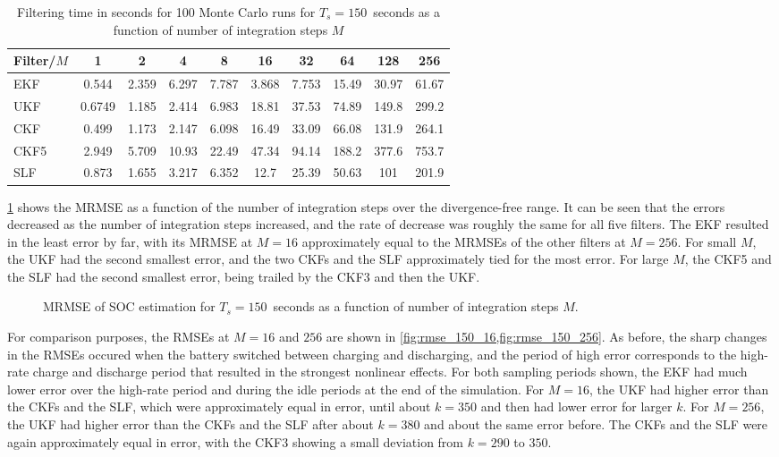\documentclass[../zhang_thesis.tex]{subfiles}
\begin{document}
\begin{table}[h]
\centering
\caption{Filtering time in seconds for 100 Monte Carlo runs for $T_s=150$~seconds as a function of number of integration steps $M$}
\begin{tabular}{@{}lccccccccc@{}}
\toprule
Filter/$M$ & 1      & 2     & 4     & 8     & 16    & 32    & 64    & 128   & 256   \\ \midrule
EKF        & 0.544  & 2.359 & 6.297 & 7.787 & 3.868 & 7.753 & 15.49 & 30.97 & 61.67 \\
UKF        & 0.6749 & 1.185 & 2.414 & 6.983 & 18.81 & 37.53 & 74.89 & 149.8 & 299.2 \\
CKF        & 0.499  & 1.173 & 2.147 & 6.098 & 16.49 & 33.09 & 66.08 & 131.9 & 264.1 \\
CKF5       & 2.949  & 5.709 & 10.93 & 22.49 & 47.34 & 94.14 & 188.2 & 377.6 & 753.7 \\
SLF        & 0.873  & 1.655 & 3.217 & 6.352 & 12.7  & 25.39 & 50.63 & 101   & 201.9 \\ \bottomrule
\end{tabular}
\label{tab:time_150}
\end{table}

\cref{fig:mrmse_150} shows the MRMSE as a function of the number of integration steps over the divergence-free range. It can be seen that the errors decreased as the number of integration steps increased, and the rate of decrease was roughly the same for all five filters. The EKF resulted in the least error by far, with its MRMSE at $M=16$ approximately equal to the MRMSEs of the other filters at $M=256$. For small $M$, the UKF had the second smallest error, and the two CKFs and the SLF
approximately tied for the most error. For large $M$, the CKF5 and the SLF had the second smallest error, being trailed by the CKF3 and then the UKF.

\begin{figure}[ht]
\centering
%
\caption{MRMSE of SOC estimation for $T_s=150$~seconds as a function of number of integration steps $M$.}
\label{fig:mrmse_150}
\end{figure}

For comparison purposes, the RMSEs at $M=16$ and $256$ are shown in \cref{fig:rmse_150_16,fig:rmse_150_256}. As before, the sharp changes in the RMSEs occured when the battery switched between charging and discharging, and the period of high error corresponds to the high-rate charge and discharge period that resulted in the strongest nonlinear effects. For both sampling periods shown, the EKF had much lower error over the high-rate period and during the idle periods at the end of the simulation. For $M=16$, the UKF had higher error than the CKFs and the SLF, which were approximately equal in error, until about $k=350$ and then had lower error for
larger $k$. For $M=256$, the UKF had higher error than the CKFs and the SLF after about $k=380$ and about the same error before. The CKFs and the SLF were again approximately equal in error, with the CKF3 showing a small deviation from $k=290$ to $350$.
\end{document}
